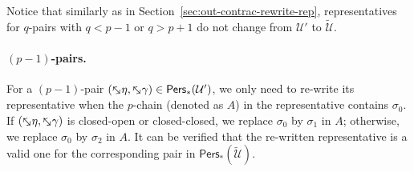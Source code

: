 \documentclass[letterpaper,11pt]{article}
\theoremstyle{mythmstyle}
\theoremstyle{mydefstyle}
\theoremstyle{plain}
\theoremstyle{definition}
\newcommand{\Pers}{\mathsf{Pers}}
\newcommand{\<}[1]{\langle #1\rangle}
\newcommand{\addel}[1]{\mskip-2.5mu\rotatebox[origin=c]{-45}{${\leftrightarrow}$}{#1}}
\newcommand{\Ucal}{\mathcal{U}}
\newcommand{\sG}{\sigma}
\newcommand{\Dim}{p}
\begin{document}
Notice that similarly as in Section~\ref{sec:out-contrac-rewrite-rep},
representatives for $q$-pairs with $q<\Dim-1$ or $q>\Dim+1$ do not change
from $\Ucal'$ to $\tilde{\Ucal}$.

\paragraph{$(\Dim-1)$-pairs.}
For a $(\Dim-1)$-pair  $(\addel{\eta},\addel{\gamma})\in\Pers_*({\Ucal'})$,
we only need to re-write its representative 
when  the $\Dim$-chain (denoted as $A$) in the representative
contains $\sG_0$.
If $(\addel{\eta},\addel{\gamma})$ is  closed-open or  closed-closed,
we replace $\sG_0$ by $\sG_1$ in $A$;
otherwise, we replace $\sG_0$ by $\sG_2$ in $A$.
It can be verified that the re-written representative is a valid one
for the corresponding pair in $\Pers_*(\tilde{\Ucal})$.
\end{document}
